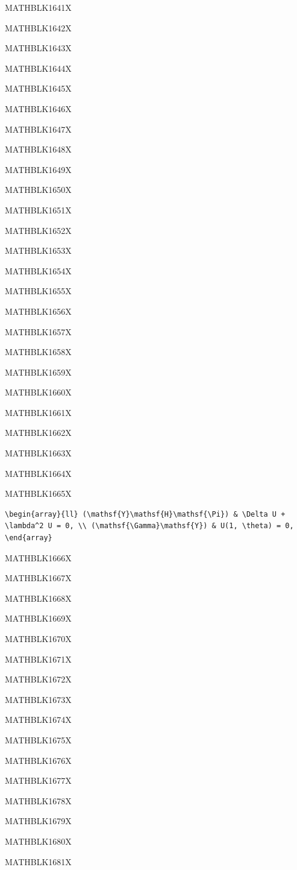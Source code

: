 \documentclass[
  ukrainian,
]{article}
\begin{document}
MATHBLK1641X

MATHBLK1642X

MATHBLK1643X

MATHBLK1644X

MATHBLK1645X

MATHBLK1646X

MATHBLK1647X

MATHBLK1648X

MATHBLK1649X

MATHBLK1650X

MATHBLK1651X

MATHBLK1652X

MATHBLK1653X

MATHBLK1654X

MATHBLK1655X

MATHBLK1656X

MATHBLK1657X

MATHBLK1658X

MATHBLK1659X

MATHBLK1660X

MATHBLK1661X

MATHBLK1662X

MATHBLK1663X

MATHBLK1664X

MATHBLK1665X

\begin{verbatim}
\begin{array}{ll} (\mathsf{Y}\mathsf{H}\mathsf{\Pi}) & \Delta U + \lambda^2 U = 0, \\ (\mathsf{\Gamma}\mathsf{Y}) & U(1, \theta) = 0, \end{array}
\end{verbatim}

MATHBLK1666X

MATHBLK1667X

MATHBLK1668X

MATHBLK1669X

MATHBLK1670X

MATHBLK1671X

MATHBLK1672X

MATHBLK1673X

MATHBLK1674X

MATHBLK1675X

MATHBLK1676X

MATHBLK1677X

MATHBLK1678X

MATHBLK1679X

MATHBLK1680X

MATHBLK1681X
\end{document}

